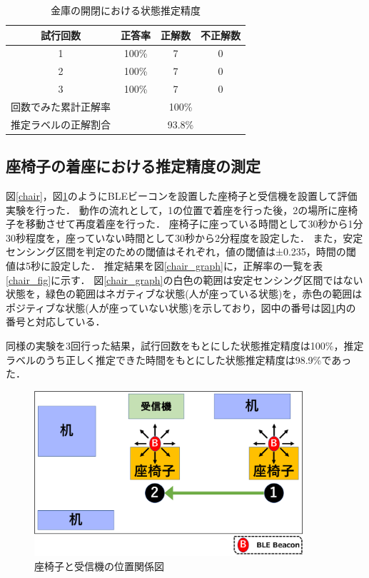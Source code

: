 \begin{table}[tbh]
    \begin{center}
        \caption{金庫の開閉における状態推定精度}
        \label{kinko_fig}
        \begin{tabular}{|c|c|c|c|} \hline
        試行回数 & 正答率 & 正解数 & 不正解数 \\ \hline
        1 & 100\% & 7 & 0 \\ \hline
        2 & 100\% & 7 & 0 \\ \hline
        3 & 100\% & 7 & 0 \\ \hline \hline
        回数でみた累計正解率 & \multicolumn{3}{c|}{100\%} \\ \hline \hline
        推定ラベルの正解割合 & \multicolumn{3}{c|}{93.8\%} \\ \hline
        \end{tabular}
    \end{center}
\end{table}


\subsection{座椅子の着座における推定精度の測定}
図\ref{chair}，図\ref{zaisu_position}のようにBLEビーコンを設置した座椅子と受信機を設置して評価実験を行った．
動作の流れとして，1の位置で着座を行った後，2の場所に座椅子を移動させて再度着座を行った．
座椅子に座っている時間として30秒から1分30秒程度を，座っていない時間として30秒から2分程度を設定した．
また，安定センシング区間を判定のための閾値はそれぞれ，値の閾値は±0.235，時間の閾値は5秒に設定した．
推定結果を図\ref{chair_graph}に，正解率の一覧を表\ref{chair_fig}に示す．
図\ref{chair_graph}の白色の範囲は安定センシング区間ではない状態を，緑色の範囲はネガティブな状態(人が座っている状態)を，赤色の範囲はポジティブな状態(人が座っていない状態)を示しており，図中の番号は図\ref{zaisu_position}内の番号と対応している．

同様の実験を3回行った結果，試行回数をもとにした状態推定精度は100\%，推定ラベルのうち正しく推定できた時間をもとにした状態推定精度は98.9\%であった．


\begin{figure}[tbh]
    \centering
    \includegraphics[width=10cm]{images/chapter3/zaisu_position.pdf}
    \caption{座椅子と受信機の位置関係図}
    \label{zaisu_position}
\end{figure}


